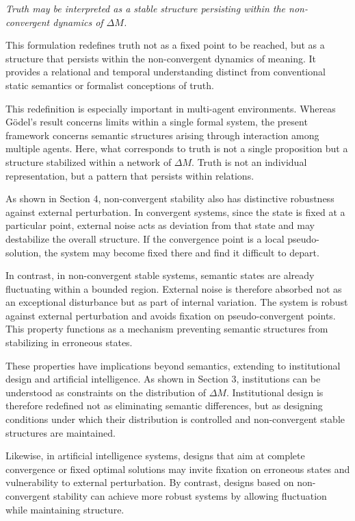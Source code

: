 \documentclass[11pt,a4paper]{article}
\theoremstyle{definition}
\begin{document}
\textit{Truth may be interpreted as a stable structure persisting within the non-convergent dynamics of $\Delta M$.}

This formulation redefines truth not as a fixed point to be reached, but as a structure that persists within the non-convergent dynamics of meaning. It provides a relational and temporal understanding distinct from conventional static semantics or formalist conceptions of truth.

This redefinition is especially important in multi-agent environments. Whereas Gödel's result concerns limits within a single formal system, the present framework concerns semantic structures arising through interaction among multiple agents. Here, what corresponds to truth is not a single proposition but a structure stabilized within a network of $\Delta M$. Truth is not an individual representation, but a pattern that persists within relations.

As shown in Section 4, non-convergent stability also has distinctive robustness against external perturbation. In convergent systems, since the state is fixed at a particular point, external noise acts as deviation from that state and may destabilize the overall structure. If the convergence point is a local pseudo-solution, the system may become fixed there and find it difficult to depart.

In contrast, in non-convergent stable systems, semantic states are already fluctuating within a bounded region. External noise is therefore absorbed not as an exceptional disturbance but as part of internal variation. The system is robust against external perturbation and avoids fixation on pseudo-convergent points. This property functions as a mechanism preventing semantic structures from stabilizing in erroneous states.

These properties have implications beyond semantics, extending to institutional design and artificial intelligence. As shown in Section 3, institutions can be understood as constraints on the distribution of $\Delta M$. Institutional design is therefore redefined not as eliminating semantic differences, but as designing conditions under which their distribution is controlled and non-convergent stable structures are maintained.

Likewise, in artificial intelligence systems, designs that aim at complete convergence or fixed optimal solutions may invite fixation on erroneous states and vulnerability to external perturbation. By contrast, designs based on non-convergent stability can achieve more robust systems by allowing fluctuation while maintaining structure.
\end{document}
